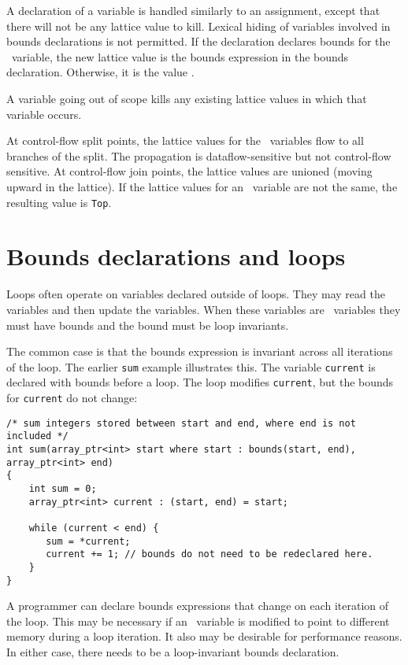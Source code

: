 A declaration of a variable is handled similarly to an assignment,
except that there will not be any lattice value to kill. Lexical hiding
of variables involved in bounds declarations is not permitted. If the
declaration declares bounds for the \arrayptr\ variable, the
new lattice value is the bounds expression in the bounds declaration.
Otherwise, it is the value \boundsnone.

A variable going out of scope kills any existing lattice values in which
that variable occurs.

At control-flow split points, the lattice values for the
\arrayptr\ variables flow to all branches of the split. The
propagation is dataflow-sensitive but not control-flow sensitive. At
control-flow join points, the lattice values are unioned (moving upward
in the lattice). If the lattice values for an \arrayptr\
variable are not the same, the resulting value is \texttt{Top}.

\section{Bounds declarations and loops}

Loops often operate on variables declared outside of loops. They may
read the variables and then update the variables. When these variables
are \arrayptr\ variables they must have bounds and the bound
must be loop invariants.

The common case is that the bounds expression is invariant across all
iterations of the loop. The earlier \texttt{sum} example illustrates
this. The variable \texttt{current} is declared with bounds before a
loop. The loop modifies \texttt{current}, but the bounds for
\texttt{current} do not change:

\begin{verbatim}
/* sum integers stored between start and end, where end is not included */
int sum(array_ptr<int> start where start : bounds(start, end), array_ptr<int> end)
{ 
    int sum = 0;
    array_ptr<int> current : (start, end) = start;

    while (current < end) {
       sum = *current;
       current += 1; // bounds do not need to be redeclared here.
    }
}
\end{verbatim}

A programmer can declare bounds expressions that change on each
iteration of the loop. This may be necessary if an \arrayptr\
variable is modified to point to different memory during a loop
iteration. It also may be desirable for performance reasons. In either
case, there needs to be a loop-invariant bounds declaration.

